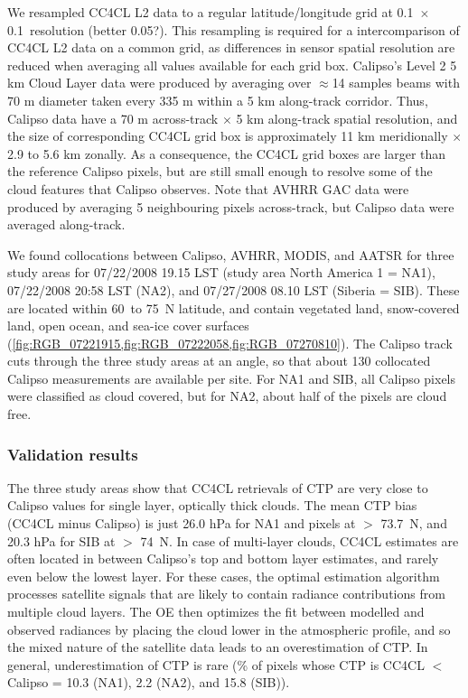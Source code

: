 We resampled CC4CL L2 data to a regular latitude/longitude grid at 0.1\textdegree\ $\times$ 0.1\textdegree\ resolution (better 0.05?). This resampling is required for a intercomparison of CC4CL L2 data on a common grid, as differences in sensor spatial resolution are reduced when averaging all values available for each grid box. Calipso's Level 2 5 km Cloud Layer data were produced by averaging over $\approx$14 samples beams with 70 m diameter taken every 335 m within a 5 km along-track corridor. Thus, Calipso data have a 70 m across-track $\times$ 5 km along-track spatial resolution, and the size of corresponding CC4CL grid box is approximately 11 km meridionally $\times$ 2.9 to 5.6 km zonally. As a consequence, the CC4CL grid boxes are larger than the reference Calipso pixels, but are still small enough to resolve some of the cloud features that Calipso observes. Note that AVHRR GAC data were produced by averaging 5 neighbouring pixels across-track, but Calipso data were averaged along-track.
 
We found collocations between Calipso, AVHRR, MODIS, and AATSR for three study areas for 07/22/2008 19.15 LST (study area North America 1 = NA1), 07/22/2008 20:58 LST (NA2), and 07/27/2008 08.10 LST (Siberia = SIB). These are located within 60\textdegree\ to 75\textdegree\ N latitude, and contain vegetated land, snow-covered land, open ocean, and sea-ice cover surfaces (\cref{fig:RGB_07221915,fig:RGB_07222058,fig:RGB_07270810}). The Calipso track cuts through the three study areas at an angle, so that about 130 collocated Calipso measurements are available per site. For NA1 and SIB, all Calipso pixels were classified as cloud covered, but for NA2, about half of the pixels are cloud free.

\subsubsection{Validation results}

The three study areas show that CC4CL retrievals of CTP are very close to Calipso values for single layer, optically thick clouds. The mean CTP bias (CC4CL minus Calipso) is just 26.0 hPa for NA1 and pixels at $>$ 73.7\textdegree\ N, and 20.3 hPa for SIB at $>$ 74\textdegree\ N. In case of multi-layer clouds, CC4CL estimates are often located in between Calipso's top and bottom layer estimates, and rarely even below the lowest layer. For these cases, the optimal estimation algorithm processes satellite signals that are likely to contain radiance contributions from multiple cloud layers. The OE then optimizes the fit between modelled and observed radiances by placing the cloud lower in the atmospheric profile, and so the mixed nature of the satellite data leads to an overestimation of CTP. In general, underestimation of CTP is rare (\% of pixels whose CTP is CC4CL $<$ Calipso = 10.3 (NA1), 2.2 (NA2), and 15.8 (SIB)).

